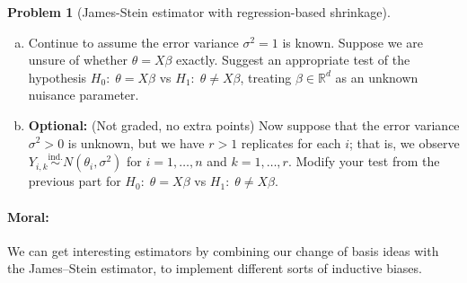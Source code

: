 \documentclass{article}
\newcommand{\RR}{\mathbb{R}}
\newcommand{\simind}{\overset{\text{ind.}}{\sim}}
\newcommand{\optional}{{\bf Optional:} (Not graded, no extra points) }
\theoremstyle{definition}
\newtheorem{problem}{Problem}
\begin{document}
\begin{problem}[James-Stein estimator with regression-based shrinkage]
\begin{enumerate}[(a)]
{\bf Hint:} The problem will become easier after an appropriate change of basis; think about how the estimator operates on different subspaces.





\item Continue to assume the error variance $\sigma^2 = 1$ is known. Suppose we are unsure of whether $\theta = X\beta$ exactly. Suggest an appropriate test of the hypothesis $H_0:\;\theta = X\beta$ vs $H_1:\; \theta \neq X\beta$, treating $\beta \in \RR^d$ as an unknown nuisance parameter.




\item \optional Now suppose that the error variance $\sigma^2>0$ is unknown, but we have $r > 1$ replicates for each $i$; that is, we observe $Y_{i,k} \simind N(\theta_i, \sigma^2)$ for $i=1,\ldots,n$ and $k=1,\ldots,r$. Modify your test from the previous part for $H_0:\;\theta = X\beta$ vs $H_1:\; \theta \neq X\beta$.





\end{enumerate}

\paragraph{Moral:} We can get interesting estimators by combining our change of basis ideas with the James--Stein estimator, to implement different sorts of inductive biases.
\end{problem}
\end{document}
